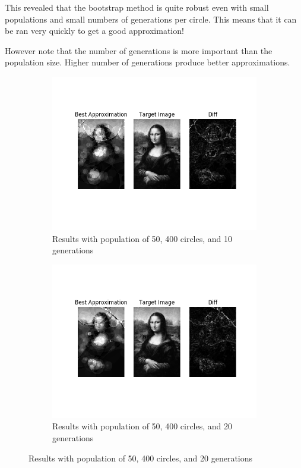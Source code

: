\documentclass{article}
\begin{document}
This revealed that the bootstrap method is quite robust even with small populations and small
numbers of generations per circle. This means that it can be ran very quickly to get a good
approximation!

However note that the number of generations is more important than the population size. Higher
number of generations produce better approximations.

\begin{figure}[H]
    \centering
    \begin{subfigure}[b]{0.45\textwidth}
        \centering
        \includegraphics[width=\textwidth]{output/bs-p50c400g10.png}
        \caption{Results with population of 50, 400 circles, and 10 generations}
    \end{subfigure}
    \begin{subfigure}[b]{0.45\textwidth}
        \centering
        \includegraphics[width=\textwidth]{output/bs-p50c400g20.png}
        \caption{Results with population of 50, 400 circles, and 20 generations}
    \end{subfigure}
\end{figure}
\end{document}
